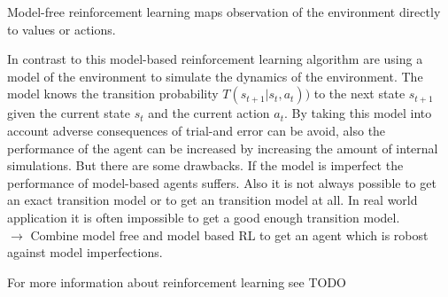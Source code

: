Model-free reinforcement learning maps observation of the environment directly to values or actions.

In contrast to this model-based reinforcement learning algorithm are using a model of the environment to simulate the dynamics of the environment. The model knows the transition probability $T(s_{t+1} | s_t, a_t))$ to the next state $s_{t+1}$ given the current state $s_t$ and the current action $a_t$. By taking this model into account adverse consequences of trial-and error can be avoid, also the performance of the agent can be increased by increasing the amount of internal simulations.
But there are some drawbacks. If the model is imperfect the performance of model-based agents suffers. Also it is not always possible to get an exact transition model or to get an transition model at all. In real world application it is often impossible to get a good enough transition model.\\







$\rightarrow$ Combine model free and model based RL to get an agent which is robost against model imperfections.

For more information about reinforcement learning see TODO


